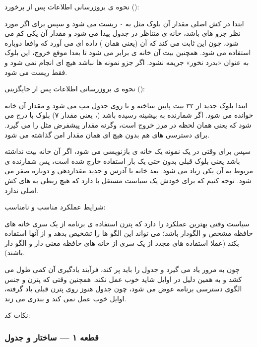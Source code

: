 \documentclass[12pt,a4paper]{article}
\begin{document}
نحوه ی بروزرسانی اطلاعات پس از برخورد ():

ابتدا در کش اصلی مقدار  آن بلوک مثل  به ۰ ریست می شود و سپس برای  اگر  مورد نظر جزو  های  باشد، خانه ی متناظر در جدول  پیدا می شود و مقدار آن یکی کم می شود، چون این  ثابت می کند که آن  (یعنی همان ) داده ای می آورد که واقعا دوباره استفاده می شود. همچنین بیت  آن خانه ی  برابر  می شود تا بعدا موقع خروج، این بلوک به عنوان «بدرد نخور» جریمه نشود. اگر  جزو نمونه ها نباشد هیچ  ای انجام نمی شود و فقط  ریست می شود.

نحوه ی بروزرسانی اطلاعات پس از جایگزینی ():

ابتدا  بلوک جدید از ۳۲ بیت پایین  ساخته و با  روی جدول مپ می شود و مقدار آن خانه خوانده می شود. اگر شمارنده به بیشینه رسیده باشد (، یعنی مقدار ۷) بلوک با  درج می شود که یعنی همان لحظه در مرز خروج است، وگرنه مقدار پیشفرض  مثل  را می گیرد. برای دسترسی های  هم بدون هیچ  ای همان مقدار امن  گذاشته می شود.

سپس برای  وقتی در یک  نمونه یک خانه ی  بازنویسی می شود، اگر آن خانه بیت  نداشته باشد یعنی بلوک قبلی بدون حتی یک بار استفاده خارج شده است، پس شمارنده ی مربوط به  آن یکی زیاد می شود. بعد خانه با آدرس و  جدید مقداردهی و  دوباره صفر می شود. توجه کنیم که  برای خودش یک سیاست  مستقل با  دارد که هیچ ربطی به  های کش اصلی ندارد.

شرایط عملکرد مناسب و نامناسب:

سیاست  وقتی بهترین عملکرد را دارد که پترن استفاده ی برنامه از یک سری خانه های حافظه مشخص و الگودار باشد؛  می تواند این الگو ها را تشخیص بدهد و از آنها استفاده بکند (عملا استفاده های مجدد از یک سری از خانه های حافظه معنی دار و الگو دار باشند).

چون  به مرور یاد می گیرد و جدول  را باید پر کند، فرآیند یادگیری آن کمی طول می کشد و به همین دلیل در اوایل شاید خوب عمل نکند. همچنین وقتی که پترن و جنس الگوی دسترسی برنامه عوض می شود، چون جدول هنوز روی پترن قبلی یاد گرفته، اوایل خوب عمل نمی کند و بندری می زند.

نکات کد:

\subsubsection{قطعه ۱ — ساختار  و جدول }
\end{document}
